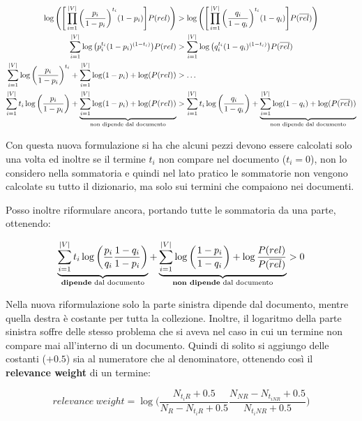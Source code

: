 \begin{align*}
\log \Bigg(\Bigg[\prod\limits_{i=1}^{|V|} \bigg(\frac{ p_{i} }{1-p_i}\bigg)^{t_i} (1-p_i)\Bigg] P(rel)\Bigg) &>\log\Bigg(\Bigg[\prod\limits_{i=1}^{|V|} \bigg(\frac{ q_{i} }{1-q_i}\bigg)^{t_i} (1-q_i)\Bigg] P(\overline{rel})\Bigg) \\
\sum\limits_{i=1}^{|V|} \log\big( p_{i}^{t_i} (1 - p_{i})^{(1-t_i)} \big) P(rel) &> \sum\limits_{i=1}^{|V|} \log\big( q_{i}^{t_i} (1 - q_{i})^{(1-t_i)} \big) P(\overline{rel}) \\
\sum\limits_{i=1}^{|V|} \log\bigg( \frac{ p_{i} }{1-p_i} \bigg)^{t_i} +\sum\limits_{i=1}^{|V|} \log(1-p_i) + \log(P(rel)) &> \ldots \\
\sum\limits_{i=1}^{|V|} t_i \log\bigg( \frac{ p_{i} }{1-p_i} \bigg) + \underbrace{\sum\limits_{i=1}^{|V|} \log(1-p_i) + \log(P(rel))}_{\text{non dipende dal documento}} &> \sum\limits_{i=1}^{|V|} t_i \log\bigg( \frac{ q_{i} }{1-q_i} \bigg) +\underbrace{\sum\limits_{i=1}^{|V|} \log(1-q_i) + \log(P(\overline{rel}))}_{\text{non dipende dal documento}}
\end{align*}

\noindent Con questa nuova formulazione si ha che alcuni pezzi devono essere calcolati solo una volta ed inoltre se il termine $t_i$ non compare nel documento ($t_i=0$), non lo considero nella sommatoria e quindi nel lato pratico le sommatorie non vengono calcolate su tutto il dizionario, ma solo sui termini che compaiono nei documenti.

Posso inoltre riformulare ancora, portando tutte le sommatoria da una parte, ottenendo:

$$
\underbrace{\sum\limits_{i=1}^{|V|} t_i \log\bigg( \frac{p_i}{q_i} \frac{1-q_i}{1-p_i}\bigg)}_{\text{\textbf{dipende} dal documento}} + \underbrace{\sum\limits_{i=1}^{|V|} \log \bigg( \frac{1-p_i}{1-q_i} \bigg) + \log \frac{P(rel)}{P(\overline{rel})}}_{\text{\textbf{non dipende} dal documento}} > 0
$$

\noindent Nella nuova riformulazione solo la parte sinistra dipende dal documento, mentre quella destra è costante per tutta la collezione.
Inoltre, il logaritmo della parte sinistra soffre delle stesso problema che si aveva nel caso in cui un termine non compare mai all'interno di un documento.
Quindi di solito si aggiungo delle costanti ($+0.5$) sia al numeratore che al denominatore, ottenendo così il \textbf{relevance weight} di un termine:

$$
\boxed{relevance \ weight = \log\bigg( \frac{N_{t_iR} + 0.5}{N_R - N_{t_iR} + 0.5} \frac{N_{NR} - N_{t_{iNR}}+ 0.5}{N_{t_iNR}+ 0.5} \bigg)}
$$

